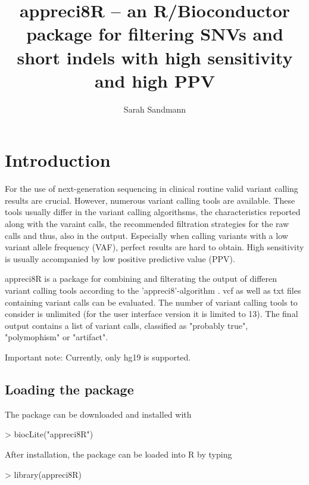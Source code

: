 \documentclass{article}
\title{appreci8R -- an R/Bioconductor package for filtering SNVs and short indels with high sensitivity and high PPV}
\author{Sarah Sandmann}
\begin{document}

\maketitle

\tableofcontents

\section{Introduction}
For the use of next-generation sequencing in clinical routine valid variant calling results are crucial. However, numerous variant calling tools are available. These tools usually differ in the variant calling algorithsms, the characteristics reported along with the varaint calls, the recommended filtration strategies for the raw calls and thus, also in the output. Especially when calling variants with a low variant allele frequency (VAF), perfect results are hard to obtain. High sensitivity is usually accompanied by low positive predictive value (PPV).

appreci8R is a package for combining and filterating the output of differen variant calling tools according to the 'appreci8'-algorithm \cite{appreci8}. vcf as well as txt files containing variant calls can be evaluated. The number of variant calling tools to consider is unlimited (for the user interface version it is limited to 13). The final output contains a list of variant calls, classified as "probably true", "polymophism" or "artifact".

Important note: Currently, only hg19 is supported.

\subsection{Loading the package}
The package can be downloaded and installed with
\medskip

\begin{Schunk}
\begin{Sinput}
> biocLite("appreci8R")
\end{Sinput}
\end{Schunk}

After installation, the package can be loaded into R by typing
\medskip

\begin{Schunk}
\begin{Sinput}
> library(appreci8R)
\end{Sinput}
\end{Schunk}
\medskip
\end{document}
